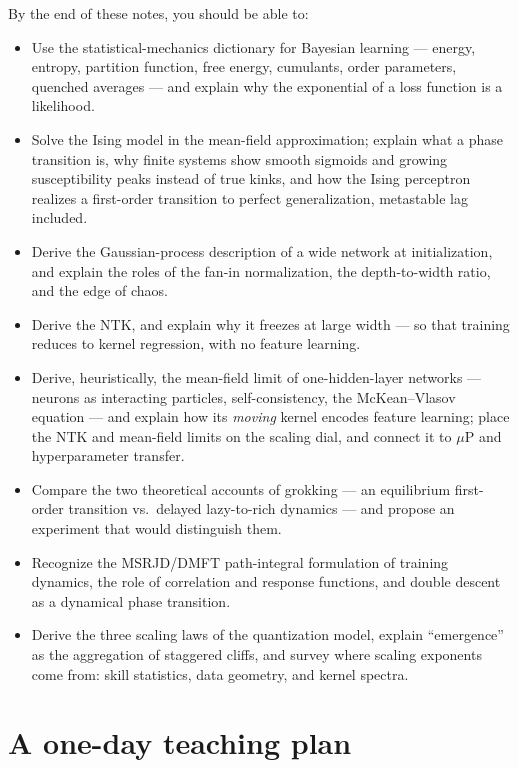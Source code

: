 \documentclass[11pt]{article}
\begin{document}
\begin{learningoutcomes}
By the end of these notes, you should be able to:
\begin{itemize}
  \item Use the statistical-mechanics dictionary for Bayesian learning --- energy, entropy, partition function, free energy, cumulants, order parameters, quenched averages --- and explain why the exponential of a loss function is a likelihood.
  \item Solve the Ising model in the mean-field approximation; explain what a phase transition is, why finite systems show smooth sigmoids and growing susceptibility peaks instead of true kinks, and how the Ising perceptron realizes a first-order transition to perfect generalization, metastable lag included.
  \item Derive the Gaussian-process description of a wide network at initialization, and explain the roles of the fan-in normalization, the depth-to-width ratio, and the edge of chaos.
  \item Derive the NTK, and explain why it freezes at large width --- so that training reduces to kernel regression, with no feature learning.
  \item Derive, heuristically, the mean-field limit of one-hidden-layer networks --- neurons as interacting particles, self-consistency, the McKean--Vlasov equation --- and explain how its \emph{moving} kernel encodes feature learning; place the NTK and mean-field limits on the scaling dial, and connect it to $\mu$P and hyperparameter transfer.
  \item Compare the two theoretical accounts of grokking --- an equilibrium first-order transition vs.\ delayed lazy-to-rich dynamics --- and propose an experiment that would distinguish them.
  \item Recognize the MSRJD/DMFT path-integral formulation of training dynamics, the role of correlation and response functions, and double descent as a dynamical phase transition.
  \item Derive the three scaling laws of the quantization model, explain ``emergence'' as the aggregation of staggered cliffs, and survey where scaling exponents come from: skill statistics, data geometry, and kernel spectra.
\end{itemize}
\end{learningoutcomes}

\section{A one-day teaching plan}
\label{sec:teaching-day}
\end{document}

